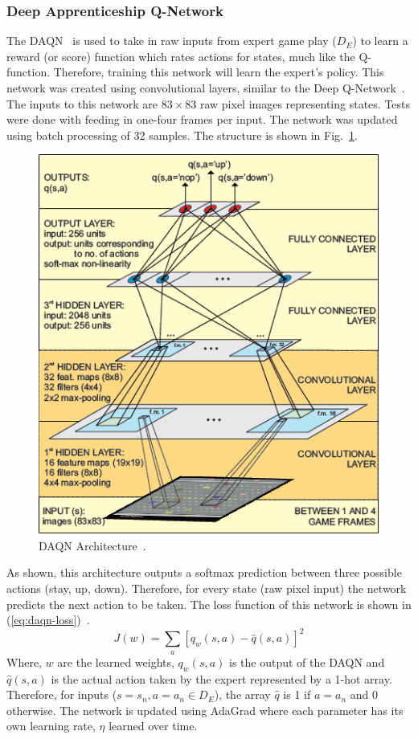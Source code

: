 \documentclass[12pt,american]{report}
\begin{document}
\subsubsection{Deep Apprenticeship Q-Network}
The DAQN~\cite{markovikj2014deep} is used to take in raw inputs from expert game play ($D_E$) to learn a reward (or score) function which rates actions for states, much like the Q-function. Therefore, training this network will learn the expert's policy. This network was created using convolutional layers, similar to the Deep Q-Network~\cite{atari}. The inputs to this network are $83\times 83$ raw pixel images representing states.  Tests were done with feeding in one-four frames per input. The network was updated using batch processing of 32 samples. The structure is shown in Fig.~\ref{fig:daqn-dal}.
\begin{figure}
\centering
\includegraphics[scale=1.5]{images/daqn-dal.png}
\caption{DAQN Architecture~\cite{markovikj2014deep}.}
\label{fig:daqn-dal}
\end{figure}
As shown, this architecture outputs a softmax prediction between three possible actions (stay, up, down).  Therefore, for every state (raw pixel input) the network predicts the next action to be taken. The loss function of this network is shown in (\ref{eq:daqn-loss})~\cite{markovikj2014deep}.
\begin{equation}
     \label{eq:daqn-loss}
     J(w) =\sum_{a}[q_w(s,a)-\hat{q}(s,a)]^2%
\end{equation}
Where, $w$ are the learned weights, $q_w(s,a)$ is the output of the DAQN and $\hat{q}(s,a)$ is the actual action taken by the expert represented by a 1-hot array.  Therefore, for inputs ($s=s_n,a=a_n \in D_E$), the array $\hat{q}$ is 1 if $a = a_n$ and 0 otherwise. The network is updated using AdaGrad where each parameter has its own learning rate, $\eta$ learned over time.
\end{document}
